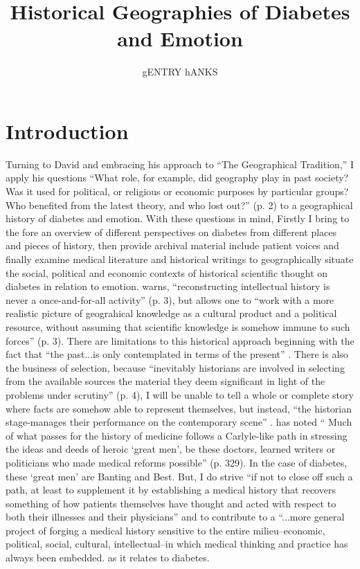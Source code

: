 \documentclass[12pt]{article}
\title{Historical Geographies of Diabetes and Emotion}
\author{gENTRY hANKS}
\begin{document}
\maketitle


\newpage
\section{Introduction}
\doublespacing
Turning to David \citet{livingstone_geographical_1993} and embracing his approach to ``The Geographical Tradition,'' I apply his questions ``What role, for example, did geography play in past society? Was it used for political, or religious or economic purposes by particular groups? Who benefited from the latest theory, and who lost out?'' (p. 2) to a geographical history of diabetes and emotion.  With these questions in mind, Firstly I bring to the fore an overview of different perspectives on diabetes from different places and pieces of history, then provide archival material include patient voices and finally examine medical literature and historical writings to geographically situate the social, political and economic contexts of historical scientific thought on diabetes in relation to emotion. 
\citet{livingstone_geographical_1993} warns, ``reconstructing intellectual history is never a once-and-for-all activity'' (p. 3), but allows one to ``work with a more realistic picture of geograhical knowledge as a cultural product and a political resource, without assuming that scientific knowledge is somehow immune to such forces'' (p. 3). There are limitations to this historical approach beginning with the fact that ``the past...is only contemplated in terms of the present'' \citep[p. 3]{livingstone_geographical_1993}. There is also the business of selection, because ``inevitably historians are involved in selecting from the available sources the material they deem significant in light of the problems under scrutiny'' (p. 4), I will be unable to tell a whole or complete story where facts are somehow able to represent themselves, but instead, ``the historian stage-manages their performance on the contemporary scene'' \citep[p. 5]{livingstone_geographical_1993}. \citet{philo_1987_Patients} has noted ``
Much of what passes for the history of medicine follows a Carlyle-like path in stressing the ideas and deeds of heroic `great men', be these doctors, learned writers or politicians who made medical reforms possible'' (p. 329). In the case of diabetes, these `great men' are Banting and Best. But, I do strive ``if not to close off such a path, at least to supplement it by establishing a medical history that recovers something of how patients themselves have thought and acted with respect to both their illnesses and their physicians'' and to contribute to a ``...more general project of forging a medical history sensitive to the entire milieu--economic, political, social, cultural, intellectual--in which medical thinking and practice has always been embedded.\citep[p. 329]{philo_1987_Patients} as it relates to diabetes. 
\end{document}
